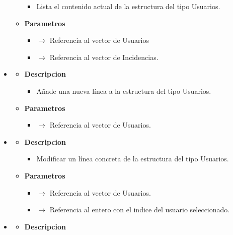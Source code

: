\begin{itemize}
\begin{itemize}
\begin{itemize}
			\item Lista el contenido actual de la estructura del tipo Usuarios.
		\end{itemize}
        \item \textbf{Parametros}
		\begin{itemize}
			\item {} $\rightarrow$ Referencia al vector de Usuarios
            \item {} $\rightarrow$ Referencia al vector de Incidencias.
		\end{itemize}
	\end{itemize}
    \item{}
	\begin{itemize}
		\item \textbf{Descripcion}
        \begin{itemize}
			\item Añade una nueva línea a la estructura del tipo Usuarios.
		\end{itemize}
        \item \textbf{Parametros}
		\begin{itemize}
			\item {} $\rightarrow$ Referencia al vector de Usuarios.
		\end{itemize}
	\end{itemize}
	\item{}
	\begin{itemize}
		\item \textbf{Descripcion}
        \begin{itemize}
			\item Modificar un línea concreta de la estructura del tipo Usuarios.
		\end{itemize}
        \item \textbf{Parametros}
		\begin{itemize}
			\item {} $\rightarrow$ Referencia al vector de Usuarios.
            \item {} $\rightarrow$ Referencia al entero con el indice del usuario seleccionado.
		\end{itemize}
	\end{itemize}
    \item{}
	\begin{itemize}
		\item \textbf{Descripcion}
        \begin{itemize}

\end{itemize}
\end{itemize}
\end{itemize}

